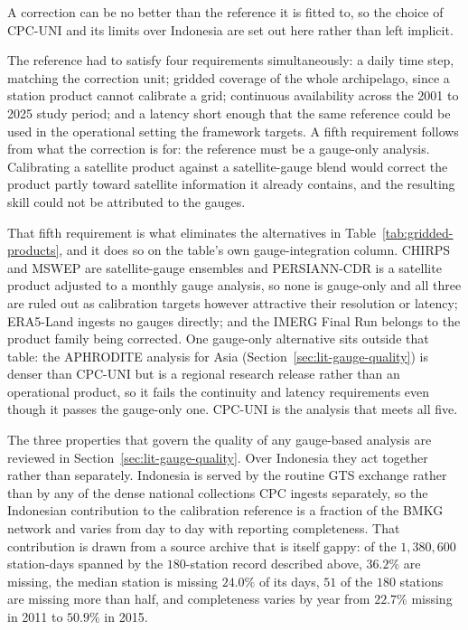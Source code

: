 A correction can be no better than the reference it is fitted to,
so the choice of CPC-UNI and its limits over Indonesia are set out
here rather than left implicit.

The reference had to satisfy four requirements simultaneously: a
daily time step, matching the correction unit; gridded coverage of
the whole archipelago, since a station product cannot calibrate a
grid; continuous availability across the 2001 to 2025 study period;
and a latency short enough that the same reference could be used in
the operational setting the framework targets. A fifth requirement
follows from what the correction is for: the reference must be a
gauge-only analysis. Calibrating a satellite product against a
satellite-gauge blend would correct the product partly toward
satellite information it already contains, and the resulting skill
could not be attributed to the gauges.

That fifth requirement is what eliminates the alternatives in
Table~\ref{tab:gridded-products}, and it does so on the table's own
gauge-integration column. CHIRPS and MSWEP are satellite-gauge
ensembles and PERSIANN-CDR is a satellite product adjusted to a
monthly gauge analysis, so none is gauge-only and all three are
ruled out as calibration targets however attractive their
resolution or latency; ERA5-Land ingests no
gauges directly; and the IMERG Final Run belongs to the product
family being corrected. One gauge-only alternative sits outside
that table: the APHRODITE analysis for Asia
(Section~\ref{sec:lit-gauge-quality}) is denser than CPC-UNI but is
a regional research release rather than an operational product, so
it fails the continuity and latency requirements even though it
passes the gauge-only one. CPC-UNI is the analysis that meets all
five.

The three properties that govern the quality of any gauge-based
analysis are reviewed in Section~\ref{sec:lit-gauge-quality}. Over
Indonesia they act together rather than separately.
Indonesia is served by the routine GTS exchange rather than by any
of the dense national collections CPC ingests separately, so the
Indonesian contribution to the calibration reference is a fraction
of the BMKG network and varies from day to day with reporting
completeness. That contribution is drawn from a source archive that
is itself gappy: of the $1{,}380{,}600$ station-days spanned by the
$180$-station record described above, $36.2\%$ are missing, the
median station is missing $24.0\%$ of its days, $51$ of the $180$
stations are missing more than half, and completeness varies by
year from $22.7\%$ missing in 2011 to $50.9\%$ in 2015.

